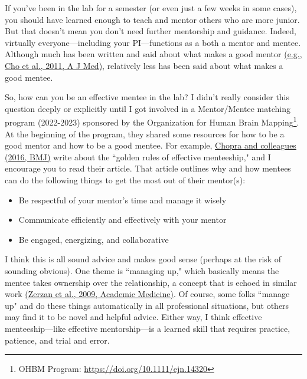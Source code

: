 \documentclass[letterpaper,11pt,oneside]{memoir}
\begin{document}
If you've been in the lab for a semester (or even just a few weeks in some cases), you should have learned enough to teach and mentor others who are more junior. But that doesn't mean you don't need further mentorship and guidance. Indeed, virtually everyone---including your PI---functions as a both a mentor and mentee. Although much has been written and said about what makes a good mentor \href{https://doi.org/10.1016/j.amjmed.2010.12.007}{(e.g., Cho et al., 2011, A J Med)}, relatively less has been said about what makes a good mentee. 

So, how can you be an effective mentee in the lab? I didn't really consider this question deeply or explicitly until I got involved in a Mentor/Mentee matching program (2022-2023) sponsored by the Organization for Human Brain Mapping\footnote{OHBM Program: \url{https://doi.org/10.1111/ejn.14320}}. At the beginning of the program, they shared some resources for how to be a good mentor and how to be a good mentee. For example, \href{https://doi.org/10.1136/bmj.i4147}{Chopra and colleagues (2016, BMJ)} write about the ``golden rules of effective menteeship," and I encourage you to read their article. That article outlines why and how mentees can do the following things to get the most out of their mentor(s):

\begin{itemize}
\item Be respectful of your mentor’s time and manage it wisely
\item Communicate efficiently and effectively with your mentor
\item Be engaged, energizing, and collaborative
\end{itemize}

I think this is all sound advice and makes good sense (perhaps at the risk of sounding obvious). One theme is ``managing up," which basically means the mentee takes ownership over the relationship, a concept that is echoed in similar work \href{https://doi.org/10.1097/ACM.0b013e3181906e8f}{(Zerzan et al., 2009, Academic Medicine)}. Of course, some folks ``manage up" and do these things automatically in all professional situations, but others may find it to be novel and helpful advice. Either way, I think effective menteeship---like effective mentorship---is a learned skill that requires practice, patience, and trial and error.
\end{document}
